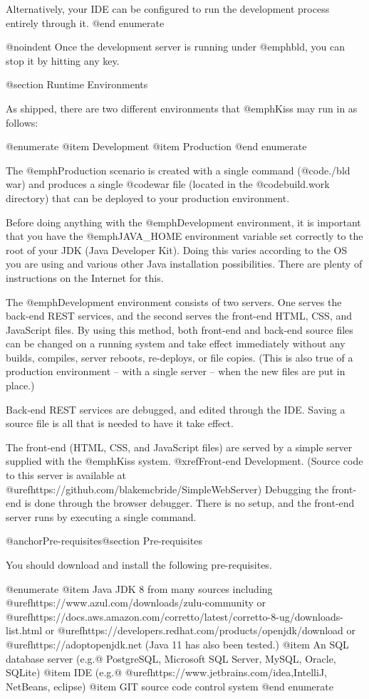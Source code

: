 Alternatively, your IDE can be configured to run the development
process entirely through it.
@end enumerate

@noindent Once the development server is running under @emph{bld}, you can stop it 
by hitting any key.

@section Runtime Environments

As shipped, there are two different environments that @emph{Kiss} may
run in as follows:

@enumerate
@item
Development
@item 
Production
@end enumerate

The @emph{Production} scenario is created with a single command
(@code{./bld war}) and produces a single @code{war} file (located in
the @code{build.work} directory) that can be deployed to your production
environment.

Before doing anything with the @emph{Development} environment, it is
important that you have the @emph{JAVA_HOME} environment variable set
correctly to the root of your JDK (Java Developer Kit).  Doing this
varies according to the OS you are using and various other Java
installation possibilities.  There are plenty of instructions on the
Internet for this.

The @emph{Development} environment consists of two servers.  One
serves the back-end REST services, and the second serves the front-end
HTML, CSS, and JavaScript files.  By using this method, both front-end
and back-end source files can be changed on a running system and take
effect immediately without any builds, compiles, server reboots,
re-deploys, or file copies.  (This is also true of a production
environment -- with a single server -- when the new files are put in place.)

Back-end REST services are debugged, and edited through the IDE.
Saving a source file is all that is needed to have it take effect.

The front-end (HTML, CSS, and JavaScript files) are served by a simple
server supplied with the @emph{Kiss} system.  @xref{Front-end
Development}.  (Source code to this server is available at
@uref{https://github.com/blakemcbride/SimpleWebServer}) Debugging the
front-end is done through the browser debugger.  There is no setup,
and the front-end server runs by executing a single command.

@anchor{Pre-requisites}@section Pre-requisites

You should download and install the following pre-requisites.

@enumerate
@item
Java JDK 8 from many sources including @uref{https://www.azul.com/downloads/zulu-community} or 
@uref{https://docs.aws.amazon.com/corretto/latest/corretto-8-ug/downloads-list.html} or
@uref{https://developers.redhat.com/products/openjdk/download} or
@uref{https://adoptopenjdk.net}  (Java 11 has also been tested.)
@item
An SQL database server (e.g.@ PostgreSQL, Microsoft SQL Server, MySQL,
Oracle, SQLite)
@item
IDE (e.g.@ @uref{https://www.jetbrains.com/idea,IntelliJ}, NetBeans, eclipse)
@item
GIT source code control system
@end enumerate

